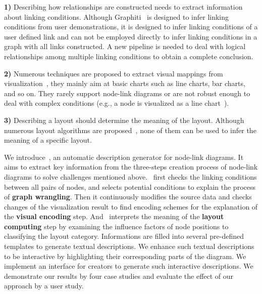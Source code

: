 \noindent \textbf{1)} 
Describing how relationships are constructed needs to extract information about linking conditions.
Although Graphiti~\cite{DBLP:journals/tvcg/SrinivasanPEB18} is designed to infer linking conditions from user demonstrations, it is designed to infer linking conditions of a user defined link and can not be employed directly to infer linking conditions in a graph with all links constructed.
A new pipeline is needed to deal with logical relationships among multiple linking conditions to obtain a complete conclusion.

\noindent \textbf{2)} %
Numerous techniques are proposed to extract visual mappings from visualization~\cite{DBLP:conf/uist/HarperA14, DBLP:journals/tvcg/HoqueA20, DBLP:journals/corr/abs-2103-00741},  they mainly aim at basic charts such as line charts, bar charts, and so on.
They rarely support node-link diagrams or are not robust enough to deal with complex conditions (e.g., a node is visualized as a line chart~\cite{DBLP:journals/bmcbi/JunkerKS06}).

\noindent \textbf{3)} Describing a layout should determine the meaning of the layout.
Although numerous layout algorithms are proposed~\cite{hachul2004drawing, DBLP:journals/spe/FruchtermanR91, DBLP:conf/gd/GansnerKN04, DBLP:conf/gd/BrandesP06, DBLP:journals/tvcg/ZhuCHHLZ21}, none of them can be used to infer the meaning of a specific layout.

We introduce~\textit{\ApproachName}, an automatic description generator for node-link diagrams.
It aims to extract key information from the three-steps creation process of node-link diagrams to solve challenges mentioned above.
\ApproachName~first checks the linking conditions between all pairs of nodes, and selects potential conditions to explain the process of \textbf{graph wrangling}.
Then it continuously modifies the source data and checks changes of the visualization result to find encoding schemes for the explanation of the \textbf{visual encoding} step.
And \ApproachName~interprets the meaning of the \textbf{layout computing} step by examining the influence factors of node positions to classifying the layout category.
Informations are filled into several pre-defined templates to generate textual descriptions.
We enhance such textual descriptions to be interactive by highlighting their corresponding parts of the diagram.
We implement an interface for creators to generate such interactive descriptions.
We demonstrate our results by four case studies and evaluate the effect of our approach by a user study.